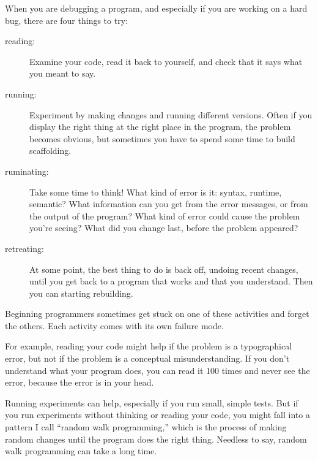 \documentclass[10pt]{book}
\begin{document}
When you are debugging a program, and especially if you are
working on a hard bug, there are four things to try:

\begin{description}

\item[reading:] Examine your code, read it back to yourself, and
check that it says what you meant to say.

\item[running:] Experiment by making changes and running different
versions.  Often if you display the right thing at the right place
in the program, the problem becomes obvious, but sometimes you have to
spend some time to build scaffolding.

\item[ruminating:] Take some time to think!  What kind of error
is it: syntax, runtime, semantic?  What information can you get from
the error messages, or from the output of the program?  What kind of
error could cause the problem you're seeing?  What did you change
last, before the problem appeared?

\item[retreating:] At some point, the best thing to do is back
off, undoing recent changes, until you get back to a program that
works and that you understand.  Then you can starting rebuilding.

\end{description}

Beginning programmers sometimes get stuck on one of these activities
and forget the others.  Each activity comes with its own failure
mode.


For example, reading your code might help if the problem is a
typographical error, but not if the problem is a conceptual
misunderstanding.  If you don't understand what your program does, you
can read it 100 times and never see the error, because the error is in
your head.


Running experiments can help, especially if you run small, simple
tests.  But if you run experiments without thinking or reading your
code, you might fall into a pattern I call ``random walk programming,''
which is the process of making random changes until the program
does the right thing.  Needless to say, random walk programming
can take a long time.

\end{document}
